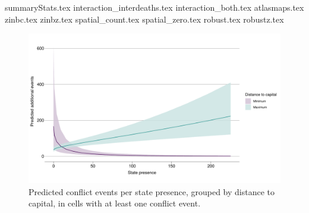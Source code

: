 {summaryStats.tex}
{interaction_interdeaths.tex}
{interaction_both.tex}
{atlasmaps.tex}
{zinbc.tex}
{zinbz.tex}
{spatial_count.tex}
{spatial_zero.tex}
{robust.tex}
{robustz.tex}


\begin{figure}[htpb]
	\centering
	\includegraphics[width=\linewidth]{"../R/Output/bothzinbplot.pdf"}
	\caption{Predicted conflict events per state presence, grouped by
	distance to capital, in cells with at least one conflict event.}
	\label{bothzinb_int}
\end{figure}



